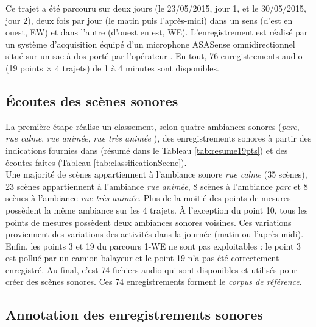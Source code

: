 Ce trajet a été parcouru sur deux jours (le 23/05/2015, jour 1, et le 30/05/2015, jour 2), deux fois par jour (le matin puis l'après-midi) dans un sens (d'est en ouest, EW) et dans l'autre (d'ouest en est, WE). L'enregistrement est réalisé par un système d'acquisition équipé d'un microphone ASASense omnidirectionnel situé sur un sac à dos porté par l'opérateur \cite{aumond2017modelling}. En tout, 76 enregistrements audio (19 points $\times$ 4 trajets) de 1 à 4 minutes sont disponibles. \\




\subsection{Écoutes des scènes sonores}

La première étape réalise un classement, selon quatre ambiances sonores (\textit{parc}, \textit{rue calme}, \textit{rue animée}, \textit{rue très animée} \cite{can_describing_2015}), des enregistrements sonores à partir des indications fournies dans \cite{aumond2017modeling} (résumé dans le Tableau \ref{tab:resume19pts}) et des écoutes faites (Tableau \ref{tab:classificationScene}).\\



Une majorité de scènes appartiennent à l'ambiance sonore \textit{rue calme} (35 scènes), 23 scènes appartiennent à l'ambiance \textit{rue animée}, 8 scènes à l'ambiance \textit{parc} et 8 scènes à l'ambiance \textit{rue très animée}. Plus de la moitié des points de mesures possèdent la même ambiance sur les 4 trajets. À l'exception du point 10, tous les points de mesures possèdent deux ambiances sonores voisines. Ces variations proviennent des variations des activités dans la journée (matin ou l'après-midi). Enfin, les points 3 et 19 du parcours 1-WE ne sont pas exploitables : le point 3 est pollué par un camion balayeur et le point 19 n'a pas été correctement enregistré. Au final, c'est 74 fichiers audio qui sont disponibles et utilisés pour créer des scènes sonores. Ces 74 enregistrements forment le \textit{corpus de référence}.

\subsection{Annotation des enregistrements sonores}\label{part:scene_annotation}

